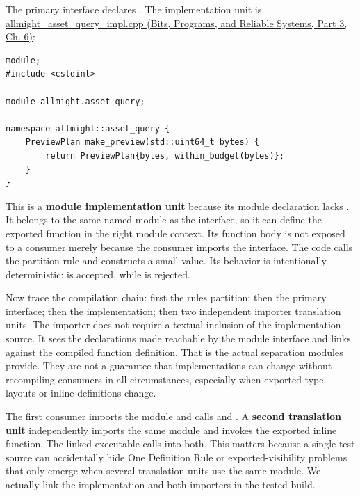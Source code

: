 The primary interface declares . The implementation unit is \href{../01-Bits-Programs-and-Reliable-Systems-P03/main.pdf\#nameddest=source-file-26fa02737266a08f013cdbb5}{allmight\_asset\_query\_impl.cpp (Bits, Programs, and Reliable Systems, Part 3, Ch. 6)}:

\begin{verbatim}
module;
#include <cstdint>

module allmight.asset_query;

namespace allmight::asset_query {
    PreviewPlan make_preview(std::uint64_t bytes) {
        return PreviewPlan{bytes, within_budget(bytes)};
    }
}
\end{verbatim}

This is a \textbf{module implementation unit} because its module declaration lacks . It belongs to the same named module as the interface, so it can define the exported function in the right module context. Its function body is not exposed to a consumer merely because the consumer imports the interface. The code calls the partition rule and constructs a small value. Its behavior is intentionally deterministic:  is accepted, while  is rejected.

Now trace the compilation chain: first the rules partition; then the primary interface; then the implementation; then two independent importer translation units. The importer does not require a textual inclusion of the implementation source. It sees the declarations made reachable by the module interface and links against the compiled function definition. That is the actual separation modules provide. They are not a guarantee that implementations can change without recompiling consumers in all circumstances, especially when exported type layouts or inline definitions change.

The first consumer imports the module and calls  and . A \textbf{second translation unit} independently imports the same module and invokes the exported inline function. The linked executable calls into both. This matters because a single test source can accidentally hide One Definition Rule or exported-visibility problems that only emerge when several translation units use the same module. We actually link the implementation and both importers in the tested build.

